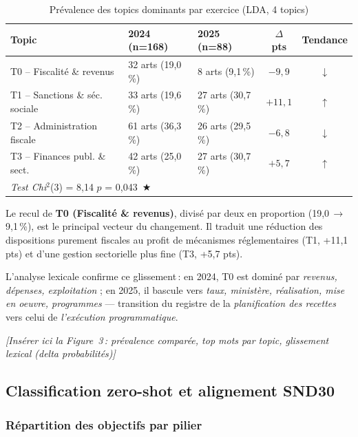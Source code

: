 \documentclass[12pt, a4paper]{article}
\newcommand{\sig}[1]{\textcolor{rougeCMR}{\textbf{#1}}}
\newcommand{\figref}[1]{\textcolor{bleuCMR}{\textit{[#1]}}}
\begin{document}
\begin{table}[H]
\centering
\caption{Prévalence des topics dominants par exercice (LDA, 4 topics)}
\label{tab:topics}
\small
\begin{tabularx}{\linewidth}{lXXcc}
\toprule
\rowcolor{bleuCMR!15}
\textbf{Topic} & \textbf{2024 (n=168)} & \textbf{2025 (n=88)} & \textbf{$\Delta$ pts} & \textbf{Tendance} \\
\midrule
T0 – Fiscalité \& revenus      & 32 arts (19,0\,\%) &  8 arts (9,1\,\%) & $-9{,}9$ & $\downarrow$ \\
T1 – Sanctions \& séc. sociale & 33 arts (19,6\,\%) & 27 arts (30,7\,\%) & $+11{,}1$ & $\uparrow$ \\
T2 – Administration fiscale    & 61 arts (36,3\,\%) & 26 arts (29,5\,\%) & $-6{,}8$ & $\downarrow$ \\
T3 – Finances publ. \& sect.   & 42 arts (25,0\,\%) & 27 arts (30,7\,\%) & $+5{,}7$ & $\uparrow$ \\
\midrule
\multicolumn{4}{l}{\textit{Test Chi}$^2$(3) = 8,14 \quad $p$ = 0,043 \,\sig{$\bigstar$}} & \\
\bottomrule
\end{tabularx}
\end{table}

Le recul de \textbf{T0 (Fiscalité \& revenus)}, divisé par deux en proportion (19,0\,$\to$\,9,1\,\%), est 
le principal vecteur du changement. Il traduit une réduction des dispositions purement fiscales 
au profit de mécanismes réglementaires (T1, +11,1 pts) et d'une gestion sectorielle plus fine (T3, +5,7 pts).

L'analyse lexicale confirme ce glissement\,: en 2024, T0 est dominé par \textit{revenus, dépenses, 
exploitation} ; en 2025, il bascule vers \textit{taux, ministère, réalisation, mise en oe{}uvre, programmes} 
— transition du registre de la \textit{planification des recettes} vers celui de \textit{l'exécution 
programmatique}.

\figref{Insérer ici la Figure~3\,: prévalence comparée, top mots par topic, glissement lexical (delta probabilités)}

\subsection{Classification zero-shot et alignement SND30}

\subsubsection{Répartition des objectifs par pilier}
\end{document}

